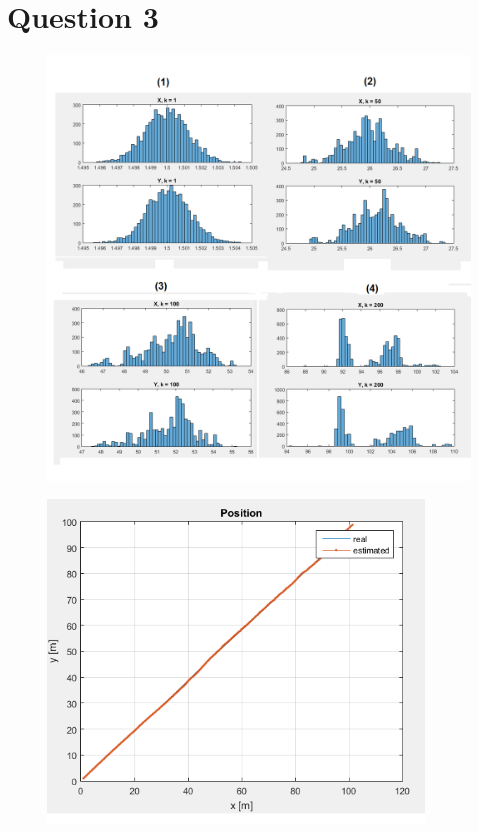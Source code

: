 \documentclass[english,DIV=13]{scrartcl}
\begin{document}
\section*{Question 3}
\begin{figure}
   \caption{\label{q3a} }
   \includegraphics[width=\textwidth,height=\textheight,keepaspectratio]{q3a.png}
\end{figure}
\begin{figure}
\begin{center}
   \caption{\label{q3b} }
   \includegraphics[width=10cm,height=\textheight,keepaspectratio]{q3b.png}
\end{center}
\end{figure}
\end{document}
